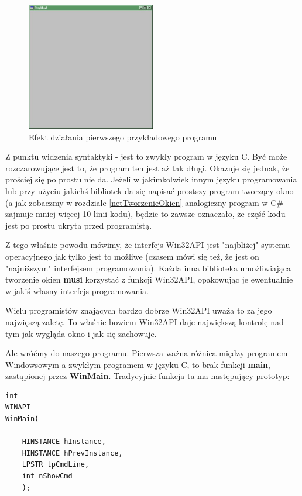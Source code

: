 \begin{figure}
\begin{center}
\includegraphics[width=0.5\textwidth]{./pic/p00}
\caption{Efekt działania pierwszego przykładowego programu}
\end{center}
\end{figure}

Z punktu widzenia syntaktyki - jest to zwykły program w języku C. Być może rozczarowujące jest to, że
program ten jest aż tak długi. Okazuje się jednak, że prościej się po prostu nie da. Jeżeli w jakimkolwiek
innym języku programowania lub przy użyciu jakichś bibliotek da się napisać prostszy program 
tworzący okno (a jak zobaczmy w rozdziale \ref{netTworzenieOkien} analogiczny program w C\# 
zajmuje mniej więcej 10 linii kodu), będzie to zawsze oznaczało, że część kodu jest po prostu ukryta przed
programistą.

Z tego właśnie powodu mówimy, że interfejs Win32API jest "najbliżej" systemu operacyjnego jak tylko jest
to możliwe (czasem mówi się też, że jest on "najniższym" interfejsem programowania). Każda inna
biblioteka umożliwiająca tworzenie okien {\bf musi} korzystać z funkcji Win32API, opakowując je
ewentualnie w jakiś własny interfejs programowania. 

Wielu programistów znających bardzo dobrze Win32API uważa to za jego najwięszą zaletę. To właśnie bowiem
Win32API daje największą kontrolę nad tym jak wygląda okno i jak się zachowuje. 

Ale wróćmy do naszego programu. Pierwsza ważna różnica między 
programem Windowsowym a zwykłym programem w języku C, to brak funkcji
{\bf main}, zastąpionej przez {\bf WinMain}. Tradycyjnie funkcja ta ma następujący prototyp:

\begin{scriptsize}
\begin{verbatim}
int
WINAPI
WinMain(

    HINSTANCE hInstance,
    HINSTANCE hPrevInstance,
    LPSTR lpCmdLine,
    int nShowCmd
    );
\end{verbatim}
\end{scriptsize}

